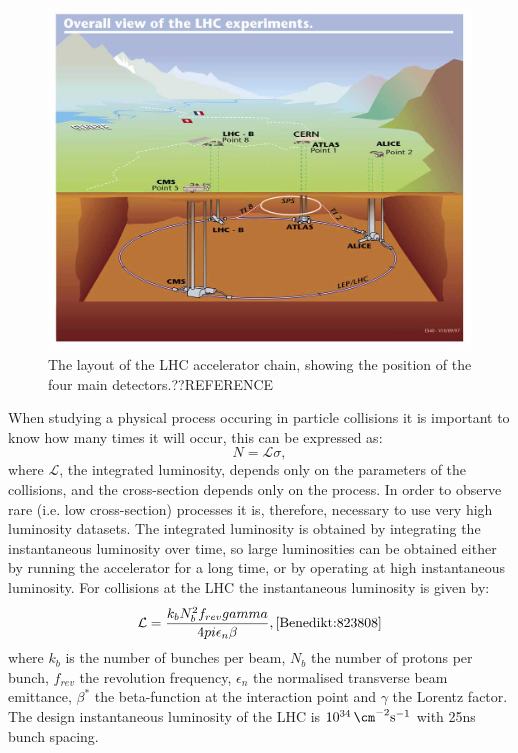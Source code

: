 \begin{figure}
  \includegraphics[width=\largefigwidth]{plots/detector/lhc_layout_sch.jpg}
  \caption{The layout of the LHC accelerator chain, showing the position of the four main detectors.??REFERENCE}
  \label{fig:lhclayout}
\end{figure}

When studying a physical process occuring in particle collisions it is important to know how many times it will occur, this can be expressed as:
\begin{equation}
  N = \mathcal{L}\sigma,
\end{equation}
where $\mathcal{L}$, the integrated luminosity, depends only on the parameters of the collisions, and the cross-section depends only on the process. In order to observe rare (i.e. low cross-section) processes it is, therefore, necessary to use very high luminosity datasets. The integrated luminosity is obtained by integrating the instantaneous luminosity over time, so large luminosities can be obtained either by running the accelerator for a long time, or by operating at high instantaneous luminosity. For collisions at the LHC the instantaneous luminosity is given by:
\begin{equation}
  \mathcal{L}=\frac{k_{b}N_{b}^{2}f_{rev}\gamma}{4\pi\epsilon_{n}\beta}, \cite{Benedikt:823808}
\end{equation}
where $k_{b}$ is the number of bunches per beam, $N_{b}$ the number of protons per bunch, $f_{rev}$ the revolution frequency, $\epsilon_{n}$ the normalised transverse beam emittance, $\beta^{*}$ the beta-function at the interaction point and $\gamma$ the Lorentz factor. The design instantaneous luminosity of the LHC is $10^{34}\,\cm^{-2}\rm{s}^{-1}$ with 25ns bunch spacing.


